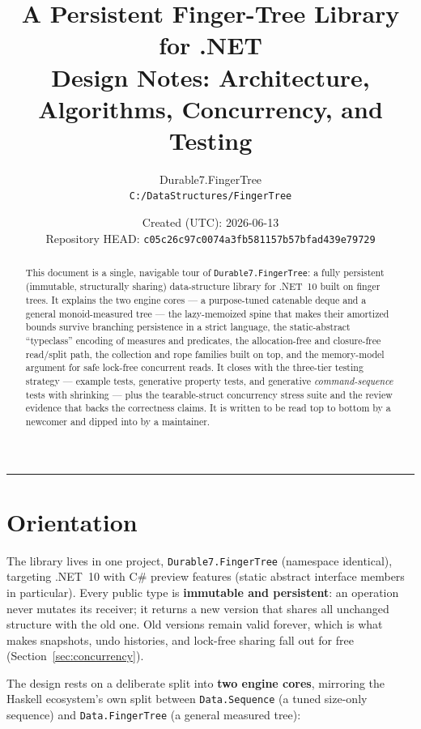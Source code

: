 \documentclass[11pt]{article}
\title{\textbf{A Persistent Finger-Tree Library for .NET}\\[2mm]
  \large Design Notes: Architecture, Algorithms, Concurrency, and Testing}
\author{Durable7.FingerTree\\ \texttt{C:/DataStructures/FingerTree}}
\date{Created (UTC): 2026-06-13\\[1mm]
  Repository HEAD: \texttt{c05c26c97c0074a3fb581157b57bfad439e79729}}
\begin{document}
\maketitle

\begin{abstract}
This document is a single, navigable tour of \texttt{Durable7.FingerTree}: a fully
persistent (immutable, structurally sharing) data-structure library for .NET~10 built on finger trees.
It explains the two engine cores --- a purpose-tuned catenable deque and a general monoid-measured
tree --- the lazy-memoized spine that makes their amortized bounds survive branching persistence in a
strict language, the static-abstract ``typeclass'' encoding of measures and predicates, the
allocation-free and closure-free read/split path, the collection and rope families built on top, and
the memory-model argument for safe lock-free concurrent reads. It closes with the three-tier testing
strategy --- example tests, generative property tests, and generative \emph{command-sequence} tests
with shrinking --- plus the tearable-struct concurrency stress suite and the review evidence that backs
the correctness claims. It is written to be read top to bottom by a newcomer and dipped into by a
maintainer.
\end{abstract}

\tableofcontents
\bigskip
\hrule
\bigskip

\section{Orientation}
\label{sec:orientation}

The library lives in one project, \texttt{Durable7.FingerTree} (namespace identical),
targeting .NET~10 with C\# preview features (static abstract interface members in particular). Every
public type is \textbf{immutable and persistent}: an operation never mutates its receiver; it returns a
new version that shares all unchanged structure with the old one. Old versions remain valid forever,
which is what makes snapshots, undo histories, and lock-free sharing fall out for free
(Section~\ref{sec:concurrency}).

The design rests on a deliberate split into \textbf{two engine cores}, mirroring the Haskell ecosystem's
own split between \texttt{Data.Sequence} (a tuned size-only sequence) and \texttt{Data.FingerTree} (a
general measured tree):
\end{document}
